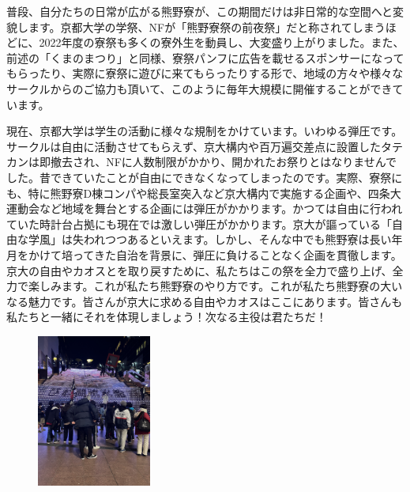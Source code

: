 普段、自分たちの日常が広がる熊野寮が、この期間だけは非日常的な空間へと変貌します。京都大学の学祭、NFが「熊野寮祭の前夜祭」だと称されてしまうほどに、2022年度の寮祭も多くの寮外生を動員し、大変盛り上がりました。また、前述の「くまのまつり」と同様、寮祭パンフに広告を載せるスポンサーになってもらったり、実際に寮祭に遊びに来てもらったりする形で、地域の方々や様々なサークルからのご協力も頂いて、このように毎年大規模に開催することができています。

現在、京都大学は学生の活動に様々な規制をかけています。いわゆる弾圧です。サークルは自由に活動させてもらえず、京大構内や百万遍交差点に設置したタテカンは即撤去され、NFに人数制限がかかり、開かれたお祭りとはなりませんでした。昔できていたことが自由にできなくなってしまったのです。実際、寮祭にも、特に熊野寮D棟コンパや総長室突入など京大構内で実施する企画や、四条大運動会など地域を舞台とする企画には弾圧がかかります。かつては自由に行われていた時計台占拠にも現在では激しい弾圧がかかります。京大が謳っている「自由な学風」は失われつつあるといえます。しかし、そんな中でも熊野寮は長い年月をかけて培ってきた自治を背景に、弾圧に負けることなく企画を貫徹します。京大の自由やカオスとを取り戻すために、私たちはこの祭を全力で盛り上げ、全力で楽しみます。これが私たち熊野寮のやり方です。これが私たち熊野寮の大いなる魅力です。皆さんが京大に求める自由やカオスはここにあります。皆さんも私たちと一緒にそれを体現しましょう！次なる主役は君たちだ！


\begin{figure}[H]
  \centering
  \includegraphics[height=5cm, angle=-90]{gazo/guriko.jpg}%
  
\end{figure}

\subsecdefault



